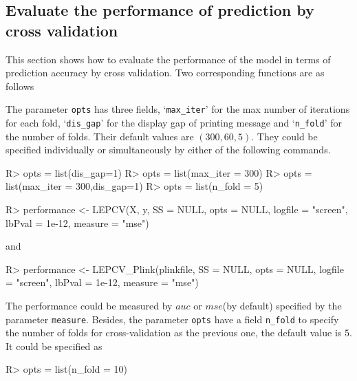 \documentclass[11pt]{article}
\begin{document}
\subsection{Evaluate the performance of prediction by cross validation}\label{cross_validation}

This section shows how to evaluate the performance of the model in terms of prediction accuracy by cross validation. Two corresponding functions are as follows

The parameter \texttt{opts} has three fields, `\texttt{max\_iter}' for the max number of iterations for each fold, `\texttt{dis\_gap}' for the display gap of printing message and `\texttt{n\_fold}' for the number of folds. Their default values are $(300,60,5)$. They could be specified individually or simultaneously by either of the following commands.
\begin{Schunk}
\begin{Sinput}
R> opts = list(dis_gap=1)
R> opts = list(max_iter = 300)
R> opts = list(max_iter = 300,dis_gap=1)
R> opts = list(n_fold = 5)
\end{Sinput}
\end{Schunk}

\begin{Schunk}
\begin{Sinput}
R> performance <- LEPCV(X, y, SS = NULL, opts = NULL, logfile = "screen",
                        lbPval = 1e-12, measure = "mse")
\end{Sinput}
\end{Schunk}

and

\begin{Schunk}
\begin{Sinput}
R> performance <- LEPCV_Plink(plinkfile, SS = NULL, opts = NULL, logfile = "screen",
                         lbPval = 1e-12, measure = "mse")
\end{Sinput}
\end{Schunk}

The performance could be measured by $auc$ or $mse$(by default) specified by the parameter \texttt{measure}. Besides, the parameter \texttt{opts} have a field \texttt{n\_fold} to specify the number of folds for cross-validation as the previous one, the default value is $5$. It could be specified as
\begin{Schunk}
\begin{Sinput}
R> opts = list(n_fold = 10)
\end{Sinput}
\end{Schunk}
\end{document}
